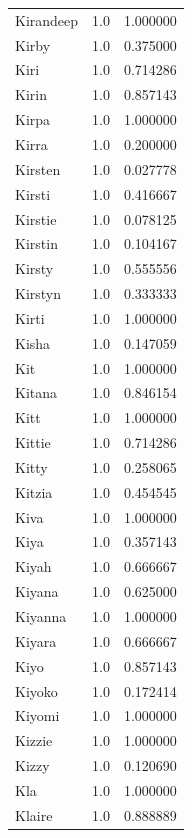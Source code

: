 \documentclass[
  letterpaper,
  DIV=11,
  numbers=noendperiod]{scrreprt}
\begin{document}
\begin{tabular}{lrr}
Kirandeep       &   1.0 &   1.000000 \\
Kirby           &   1.0 &   0.375000 \\
Kiri            &   1.0 &   0.714286 \\
Kirin           &   1.0 &   0.857143 \\
Kirpa           &   1.0 &   1.000000 \\
Kirra           &   1.0 &   0.200000 \\
Kirsten         &   1.0 &   0.027778 \\
Kirsti          &   1.0 &   0.416667 \\
Kirstie         &   1.0 &   0.078125 \\
Kirstin         &   1.0 &   0.104167 \\
Kirsty          &   1.0 &   0.555556 \\
Kirstyn         &   1.0 &   0.333333 \\
Kirti           &   1.0 &   1.000000 \\
Kisha           &   1.0 &   0.147059 \\
Kit             &   1.0 &   1.000000 \\
Kitana          &   1.0 &   0.846154 \\
Kitt            &   1.0 &   1.000000 \\
Kittie          &   1.0 &   0.714286 \\
Kitty           &   1.0 &   0.258065 \\
Kitzia          &   1.0 &   0.454545 \\
Kiva            &   1.0 &   1.000000 \\
Kiya            &   1.0 &   0.357143 \\
Kiyah           &   1.0 &   0.666667 \\
Kiyana          &   1.0 &   0.625000 \\
Kiyanna         &   1.0 &   1.000000 \\
Kiyara          &   1.0 &   0.666667 \\
Kiyo            &   1.0 &   0.857143 \\
Kiyoko          &   1.0 &   0.172414 \\
Kiyomi          &   1.0 &   1.000000 \\
Kizzie          &   1.0 &   1.000000 \\
Kizzy           &   1.0 &   0.120690 \\
Kla             &   1.0 &   1.000000 \\
Klaire          &   1.0 &   0.888889 \\

\end{tabular}
\end{document}
